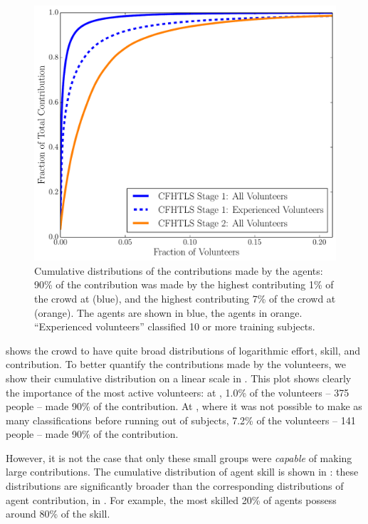 \documentclass[useAMS,usenatbib,a4paper]{mn2e}
\begin{document}
\begin{figure}
\centering\includegraphics[width=0.9\linewidth]{crowd_contrib_cumul.pdf}
\caption{Cumulative distributions of the contributions made by the agents: 90\%
of the contribution was made by the highest contributing 1\% of the crowd at
\StageOne (blue), and the highest contributing  7\% of the crowd at \StageTwo
(orange). The \StageOne agents are shown in blue, the \StageTwo agents in
orange. ``Experienced volunteers'' classified 10 or more training subjects.}
\label{fig:crowd:cumulplot}
\end{figure}

 shows the \SW crowd to have quite broad
distributions of logarithmic effort, skill, and contribution. To better
quantify the contributions made by the volunteers, we show their cumulative
distribution on a linear scale in . This plot shows
clearly the importance of the most active volunteers: at
\StageOne,  1.0\% of the volunteers -- 375 people -- made 90\% of the
contribution.  At \StageTwo, where it was not possible to make as
many classifications before running out of subjects, 7.2\% of the volunteers
-- 141 people -- made 90\% of the contribution.

However, it is not the case that only these small groups were {\it capable} of
making large contributions. The cumulative distribution of agent skill is shown
in : these distributions are significantly
broader than the corresponding distributions of agent contribution, in
. For example,
the most skilled 20\% of agents possess around 80\% of the skill.
\end{document}

